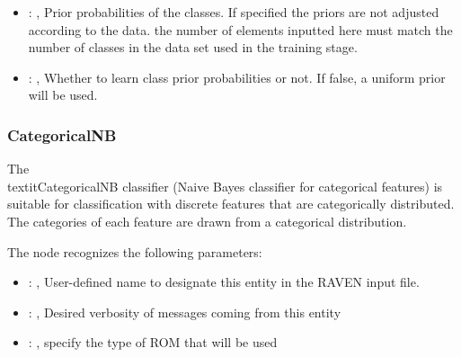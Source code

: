 \begin{itemize}
    \item {}: , 
      Prior probabilities of the classes. If specified the priors are
      not adjusted according to the data. \nb the number of elements inputted here must
      match the number of classes in the data set used in the training stage.

    \item {}: , 
      Whether to learn class prior probabilities or not. If false, a uniform
      prior will be used.
  \end{itemize}


\subsubsection{CategoricalNB}
  The \\textit{CategoricalNB} classifier (Naive Bayes classifier for categorical features)
  is suitable for classification with discrete features that are categorically distributed.
  The categories of each feature are drawn from a categorical distribution.

  The  node recognizes the following parameters:
    \begin{itemize}
      \item {}: , 
        User-defined name to designate this entity in the RAVEN input file.
      \item {}: , 
        Desired verbosity of messages coming from this entity
      \item {}: , 
        specify the type of ROM that will be used
  \end{itemize}


